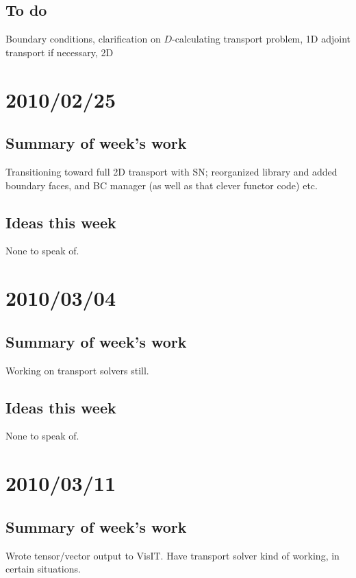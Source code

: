 \documentclass[11pt]{SRJresearch}
\begin{document}
\subsection{To do}
Boundary conditions, clarification on $D$-calculating transport problem, 1D
adjoint transport if necessary, 2D 
\section{2010/02/25}

\subsection{Summary of week's work}
Transitioning toward full 2D transport with SN; reorganized library and added
boundary faces, and BC manager (as well as that clever functor code) etc.

\subsection{Ideas this week}
None to speak of.
\section{2010/03/04}

\subsection{Summary of week's work}
Working on transport solvers still.

\subsection{Ideas this week}
None to speak of.

\section{2010/03/11}

\subsection{Summary of week's work}
Wrote tensor/vector output to VisIT. Have transport solver kind of working, in
certain situations.
\end{document}
